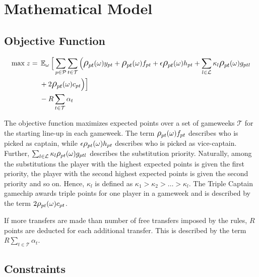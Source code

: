 \section{Mathematical Model} \label{mathematical_model}

\subsection{Objective Function}

\begin{equation}
\smaller
\begin{aligned}
\text{max} \; z ={} & \EX_{\omega} \Big\lbrack\sum\limits_{p \in \mathcal{P}} \sum\limits_{t \in \mathcal{T}} \Big( \mathlarger{\rho}_{pt}(\omega)y_{pt} + \mathlarger{\rho}_{pt}(\omega)f_{pt} + \epsilon  \mathlarger{\rho}_{pt}(\omega)h_{pt} + \sum_{l \in \mathcal{L}}\kappa_{l} \mathlarger{\rho}_{pt}(\omega)g_{ptl}\\ 
& + 2 \mathlarger{\rho}_{pt}(\omega)c_{pt} \Big)  \Big\rbrack \\ 
& - R\sum_{t \in \mathcal{T}}\alpha_{t}
\end{aligned}
\end{equation}

\newpar
The objective function maximizes expected points over a set of gameweeks $\mathcal{T}$ for the starting line-up in each gameweek. The term $\mathlarger{\rho}_{pt}(\omega)f_{pt}$ describes who is picked as captain, while $\epsilon \mathlarger{\rho}_{pt}(\omega)h_{pt}$ describes who is picked as vice-captain. Further, $\sum_{l \in \mathcal{L}}\kappa_{l} \mathlarger{\rho}_{pt}(\omega)g_{ptl}$ describes the substitution priority. Naturally, among the substitutions the player with the highest expected points is given the first priority, the player with the second highest expected points is given the second priority and so on. Hence, $\kappa_{l}$ is defined as $\kappa_{1} > \kappa_{2} > \ldots > \kappa_{l}$. The Triple Captain gamechip awards triple points for one player in a gameweek and is described by the term $2 \mathlarger{\rho}_{pt}(\omega)c_{pt}$. 

\newpar

If more transfers are made than number of free transfers  imposed by the rules, $R$ points are deducted for each additional transfer. This is described by the term $R\sum_{t \in \mathcal{T}}\alpha_{t}$. 


\subsection{Constraints}

